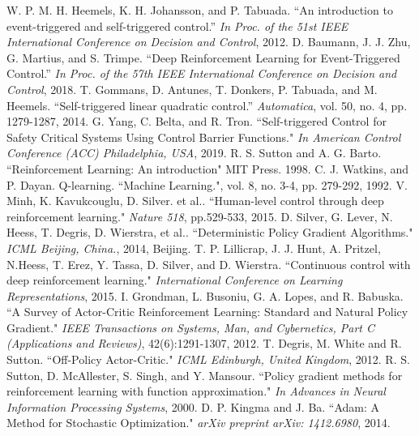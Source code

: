 \documentclass[english, dvipdfmx]{ampmt}             %
\begin{document}
\begin{thebibliography}{20}
W. P. M. H. Heemels, K. H. Johansson, and P. Tabuada. ``An introduction to event-triggered and self-triggered control.” \textit{In Proc. of the 51st IEEE International Conference on Decision and Control}, 2012.
D. Baumann, J. J. Zhu, G. Martius, and S. Trimpe. ``Deep Reinforcement Learning for Event-Triggered Control.”  \textit{In Proc. of the 57th IEEE International Conference on Decision and Control}, 2018.
T. Gommans, D. Antunes, T. Donkers, P. Tabuada, and M. Heemels. ``Self-triggered linear quadratic control.” \textit{Automatica}, vol. 50, no. 4, pp. 1279-1287, 2014.
G. Yang, C. Belta, and R. Tron. ``Self-triggered Control for Safety Critical Systems Using Control Barrier Functions."  \textit{In American Control Conference (ACC) Philadelphia, USA}, 2019.
R. S. Sutton and A. G. Barto. ``Reinforcement Learning: An introduction" MIT Press. 1998.
C. J. Watkins, and P. Dayan. Q-learning. ``Machine Learning.", vol. 8, no. 3-4, pp. 279-292, 1992.
V. Minh, K. Kavukcouglu, D. Silver. et al.. ``Human-level control through deep reinforcement learning." \textit{Nature 518}, pp.529-533, 2015.
D. Silver, G. Lever, N. Heess, T. Degris, D. Wierstra, et al.. ``Deterministic Policy Gradient Algorithms." \textit{ICML Beijing, China.}, 2014, Beijing.
T. P. Lillicrap, J. J. Hunt, A. Pritzel, N.Heess, T. Erez, Y. Tassa, D. Silver, and D. Wierstra. ``Continuous control with deep reinforcement learning." \textit{International Conference on Learning Representations}, 2015.
I. Grondman, L. Busoniu, G. A. Lopes, and R. Babuska. ``A Survey of Actor-Critic Reinforcement Learning: Standard and Natural Policy Gradient." \textit{IEEE Transactions on Systems, Man, and Cybernetics, Part C (Applications and Reviews)}, 42(6):1291-1307, 2012.
T. Degris, M. White and R. Sutton. ``Off-Policy Actor-Critic." \textit{ICML Edinburgh, United Kingdom}, 2012.
R. S. Sutton, D. McAllester, S. Singh, and Y. Mansour. ``Policy gradient methods for reinforcement learning with function approximation." \textit{In Advances in Neural Information Processing Systems}, 2000.
D. P. Kingma and J. Ba. ``Adam: A Method for Stochastic Optimization." \textit{arXiv preprint arXiv: 1412.6980}, 2014.

\end{thebibliography}
\end{document}
